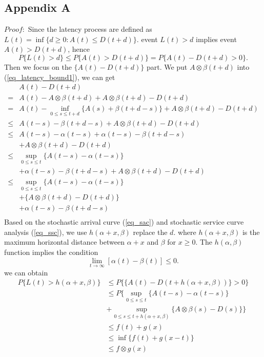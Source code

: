 \documentclass[conference]{IEEEtran}
\begin{document}
\subsection{Appendix A}
$Proof:$ Since the latency process are defined as $L(t) = \inf\{d \geq 0 : A(t) \leq D(t+d)\}.$
event ${L(t)} > d$ implies event ${A(t)>D(t+d)}$, hence
\begin{equation}\label{eq_latency_bound1}
P\{L(t)>d\} \leqslant P\{{A(t)>D(t+d)}\} = P\{A(t) - D(t+d)> 0\}.
\end{equation}
Then we focus on the $\{A(t) - D(t+d)\}$ part. We put $A\otimes \beta(t+d)$ into (\ref{eq_latency_bound1}), we can get
\begin{align*}
&A(t) - D(t+d) \\
=&A(t) - A\otimes \beta(t+d) + A\otimes \beta(t+d) - D(t+d) \\
=&A(t) - \inf_{0\leqslant s \leqslant t+d}\{A(s)+ \beta(t+d-s)\} + A\otimes \beta(t+d) - D(t+d) \\
\leq &A(t-s) - \beta(t+d-s) + A\otimes \beta(t+d) - D(t+d) \\
\leq&A(t-s) - \alpha(t-s) + \alpha(t-s) - \beta(t+d-s) \\
&+A\otimes \beta(t+d) - D(t+d) \\
\leq &\sup_{0\leqslant s \leqslant t}\{A(t-s)-\alpha(t-s)\} \\
&+\alpha(t-s)-\beta(t+d-s) + A\otimes \beta(t+d)-D(t+d) \\
\leq &\sup_{0\leqslant s \leqslant t}\{A(t-s)-\alpha(t-s)\} \\
&+\{A\otimes \beta(t+d)-D(t+d)\}  \\
&+\alpha(t-s)-\beta(t+d-s) \\
\end{align*}
Based on the stochastic arrival curve (\ref{eq_sac}) and stochastic service curve analysis (\ref{eq_ssc}), we use $h(\alpha+x, \beta)$ replace the $d$. where $h(\alpha+x,\beta)$ is the maximum horizontal distance between $\alpha+x$ and $\beta$ for $x \geq 0$. The $h(\alpha,\beta)$ function implies the condition
\begin{equation}\label{condition}
\lim_{t\rightarrow\infty}[\alpha(t)-\beta(t)]\leq 0.
\end{equation}
we can obtain
\begin{align*}
P\{L(t)>h(\alpha+x, \beta)\} &\leqslant P\{\{A(t) - D(t+h(\alpha+x, \beta))\} > 0\}  \\
&\leqslant P\{\sup_{0\leqslant s \leqslant t}\{A(t-s)-\alpha(t-s)\}  \\
&+\sup_{0\leqslant s \leqslant t+h(\alpha+x, \beta)}\{A\otimes \beta(s)-D(s)\} \} \\
&\leqslant f(t)+g(x) \\
&\leqslant \inf\{f(t)+g(x-t)\} \\
&\leqslant f\otimes g(x)
\end{align*}
\end{document}
